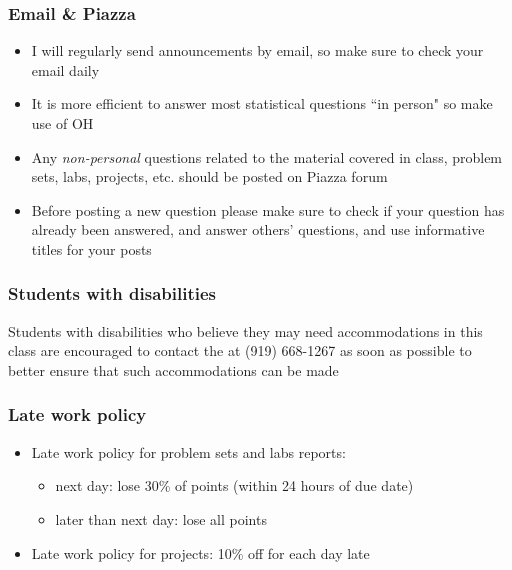 \documentclass[slidestop,compress,mathserif,12pt,t,professionalfonts,xcolor=table]{beamer}
\begin{document}

\begin{frame}
\frametitle{Email \& Piazza}

\begin{itemize}

\item I will regularly send announcements by email, so make sure to check your email  daily

\item It is more efficient to answer most statistical questions ``in person" so make use of OH

\item Any \emph{non-personal} questions related to the material covered in class, problem sets, labs, projects, etc. should be posted on Piazza forum

\item Before posting a new question please make sure to check if your question has already been answered, and answer others' questions, and use informative titles for your posts

\end{itemize}

\end{frame}


\begin{frame}
\frametitle{Students with disabilities}

Students with disabilities who believe they may need accommodations in this class are encouraged to contact the  at (919) 668-1267 as soon as possible to better ensure that such accommodations can be made

\vfill


\end{frame}


\begin{frame}
\frametitle{Late work policy}

\begin{itemize}

\item Late work policy for problem sets and labs reports:
\begin{itemize}
\item next day: lose 30\% of points (within 24 hours of due date)
\item later than next day: lose all points
\end{itemize}

\item Late work policy for projects: 10\% off for each day late

\end{itemize}

\end{frame}
\end{document}
